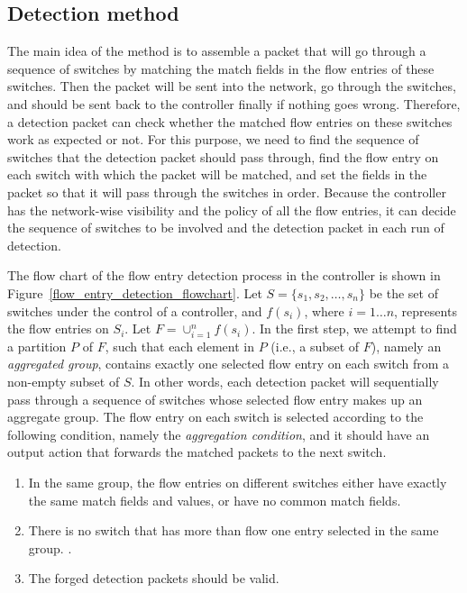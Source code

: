 \subsection{Detection method}
\label{Detection_method}
The main idea of the method is to assemble a packet that will go through a sequence of switches by matching the match fields in the flow entries of these switches. Then the packet will be sent into the network, go through the switches, and should be sent back to the controller finally if nothing goes wrong. Therefore, a detection packet can check whether the matched flow entries on these switches work as expected or not. For this purpose, we need to find the sequence of switches that the detection packet should pass through, find the flow entry on each switch with which the packet will be matched, and set the fields in the packet so that it will pass through the switches in order. Because the controller has the network-wise visibility and the policy of all the flow entries, it can decide the sequence of switches to be involved and the detection packet in each run of detection.

The flow chart of the flow entry detection process in the controller is shown in Figure~\ref{flow_entry_detection_flowchart}. Let $S=\{s_1,s_2,\ldots,s_n\}$ be the set of switches under the control of a controller, and $f(s_i)$, where $i=1\ldots n$, represents the flow entries on $S_i$. Let $F=\cup_{i=1}^n f(s_i)$. In the first step, we attempt to find a partition $P$ of $F$, such that each element in $P$ (i.e., a subset of $F$), namely an \textit{aggregated group}, contains exactly one selected flow entry on each switch from a non-empty subset of $S$. In other words, each detection packet will sequentially pass through a sequence of switches whose selected flow entry makes up an aggregate group. The flow entry on each switch is selected according to the following condition, namely the \textit{aggregation condition}, and it should have an output action that forwards the matched packets to the next switch.

\begin{enumerate}
\item
In the same group, the flow entries on different switches either have exactly the same match fields and values, or have no common match fields.
\item
There is no switch that has more than flow one entry selected in the same group. .
\item
The forged detection packets should be valid. 
\end{enumerate}

